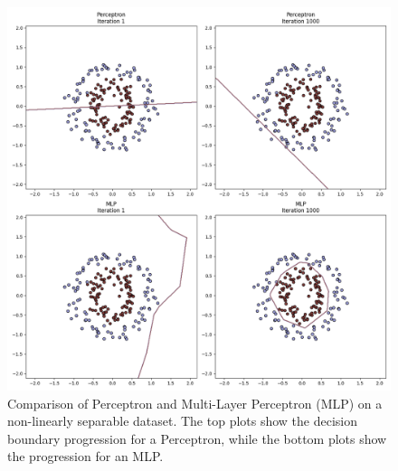 \documentclass[english,11pt,a4paper,titlepage]{article}
\begin{document}
	\begin{figure}[h]
		\centering
		\includegraphics[width=0.8\linewidth]{img/perceptron_vs_mlp.png}
		\caption{Comparison of Perceptron and Multi-Layer Perceptron (MLP) on a non-linearly separable dataset. The top plots show the decision boundary progression for a Perceptron, while the bottom plots show the progression for an MLP.}
		\label{fig:perceptron_vs_mlp}
	\end{figure}
	
\end{document}

